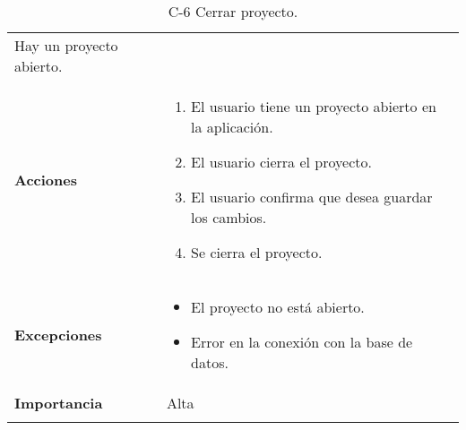 \begin{longtable}[H]{@{}ll@{}}
\begin{minipage}[t]{0.71\columnwidth}
Hay un proyecto abierto.
\strut
\end{minipage}\tabularnewline
\begin{minipage}[t]{0.23\columnwidth}\raggedright\strut
\textbf{Acciones}\strut
\end{minipage} & \begin{minipage}[t]{0.71\columnwidth}\raggedright\strut
\begin{enumerate}
\def\labelenumi{\arabic{enumi}.}
\item
El usuario tiene un proyecto abierto en la aplicación.
\item
El usuario cierra el proyecto.
\item
El usuario confirma que desea guardar los cambios.
\item
Se cierra el proyecto.
\end{enumerate}\strut
\end{minipage}\tabularnewline
\begin{minipage}[t]{0.23\columnwidth}\raggedright\strut
\textbf{Excepciones}\strut
\end{minipage} & \begin{minipage}[t]{0.71\columnwidth}\raggedright\strut
\begin{itemize}
\item
El proyecto no está abierto.
\item
Error en la conexión con la base de datos.
\end{itemize}\strut
\end{minipage}\tabularnewline
\begin{minipage}[t]{0.23\columnwidth}\raggedright\strut
\textbf{Importancia}\strut
\end{minipage} & \begin{minipage}[t]{0.71\columnwidth}\raggedright\strut
Alta\strut
\end{minipage}\tabularnewline
\bottomrule
\caption{C-6 Cerrar proyecto.}
\end{longtable}



